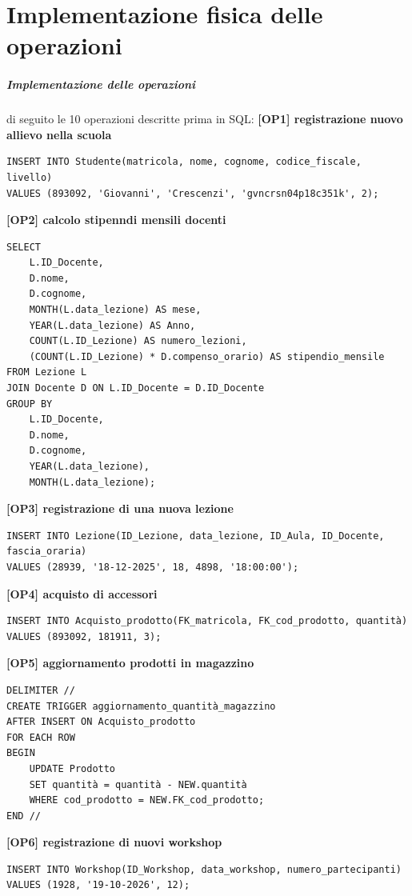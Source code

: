 \chapter{Implementazione fisica delle operazioni}
\paragraph{Implementazione delle operazioni} di seguito le 10 operazioni descritte prima in SQL: 
\newline
\newline
\textbf{[OP1] registrazione nuovo allievo nella scuola}
\begin{lstlisting}
INSERT INTO Studente(matricola, nome, cognome, codice_fiscale, livello)
VALUES (893092, 'Giovanni', 'Crescenzi', 'gvncrsn04p18c351k', 2); 
\end{lstlisting}
\newpage
\textbf{[OP2] calcolo stipenndi mensili docenti}
\begin{lstlisting}
SELECT 
    L.ID_Docente, 
	D.nome, 
	D.cognome, 
	MONTH(L.data_lezione) AS mese, 
	YEAR(L.data_lezione) AS Anno, 
	COUNT(L.ID_Lezione) AS numero_lezioni, 
	(COUNT(L.ID_Lezione) * D.compenso_orario) AS stipendio_mensile
FROM Lezione L 
JOIN Docente D ON L.ID_Docente = D.ID_Docente
GROUP BY 
	L.ID_Docente,
	D.nome, 
	D.cognome, 
	YEAR(L.data_lezione), 
	MONTH(L.data_lezione); 
\end{lstlisting}
\textbf{[OP3] registrazione di una nuova lezione}
\begin{lstlisting}
INSERT INTO Lezione(ID_Lezione, data_lezione, ID_Aula, ID_Docente, fascia_oraria) 
VALUES (28939, '18-12-2025', 18, 4898, '18:00:00'); 
\end{lstlisting}
\textbf{[OP4] acquisto di accessori}
\begin{lstlisting}
INSERT INTO Acquisto_prodotto(FK_matricola, FK_cod_prodotto, quantità)
VALUES (893092, 181911, 3); 
\end{lstlisting}
\newpage
\textbf{[OP5] aggiornamento prodotti in magazzino}
\begin{lstlisting}
DELIMITER //
CREATE TRIGGER aggiornamento_quantità_magazzino 
AFTER INSERT ON Acquisto_prodotto 
FOR EACH ROW 
BEGIN 
	UPDATE Prodotto 
	SET quantità = quantità - NEW.quantità
	WHERE cod_prodotto = NEW.FK_cod_prodotto; 
END //
\end{lstlisting}
\textbf{[OP6] registrazione di nuovi workshop}
\begin{lstlisting}
INSERT INTO Workshop(ID_Workshop, data_workshop, numero_partecipanti) 
VALUES (1928, '19-10-2026', 12); 
\end{lstlisting}

